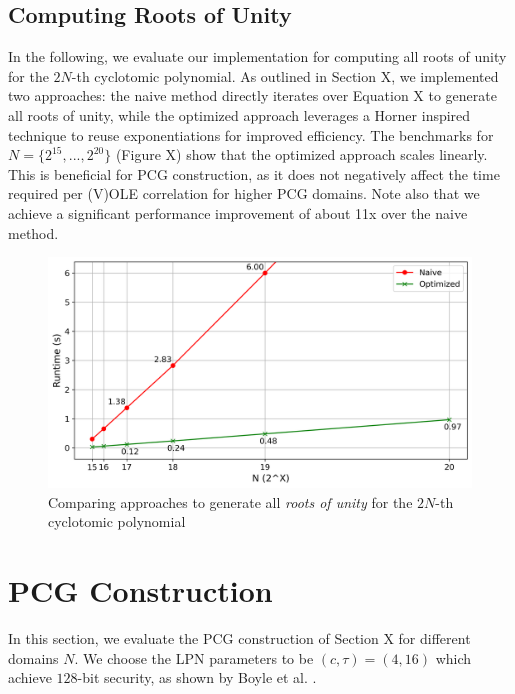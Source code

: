 \subsection{Computing Roots of Unity}
In the following, we evaluate our implementation for computing all roots of unity for the $2N$-th cyclotomic polynomial. As outlined in Section \todo X, we implemented two approaches: the naive method directly iterates over Equation X to generate all roots of unity, while the optimized approach leverages a Horner inspired technique to reuse exponentiations for improved efficiency. The benchmarks for $N=\{2^{15}, ..., 2^{20}\}$ (Figure X) show that the optimized approach scales linearly. This is beneficial for PCG construction, as it does not negatively affect the time required per (V)OLE correlation for higher PCG domains. Note also that we achieve a significant performance improvement of about 11x over the naive method.

\begin{figure}[t]
    \centering
    \includegraphics[scale=0.49]{images/plots/gen_roots.png}
    \caption{Comparing approaches to generate all \textit{roots of unity} for the $2N$-th cyclotomic polynomial}
\end{figure}


\section{PCG Construction}
In this section, we evaluate the PCG construction of Section \todo X for different domains $N$. We choose the LPN parameters to be $(c,\tau)=(4,16)$ which achieve $128$-bit security, as shown by Boyle et al. \cite{boyle2020efficient}. 

